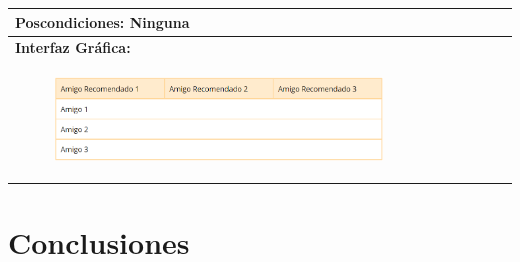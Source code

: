 \documentclass{report}
\begin{document}
\begin{center}
\begin{longtable}{|p{\linewidth}|}
                        \hline
                        \textbf{Poscondiciones:} Ninguna\\
                        \hline
                        \textbf{Interfaz Gráfica:}\\
                        \begin{figure}[H]
                            \centering
                            \includegraphics[width=0.8\textwidth]{./img/grafico/IU Recomendaciones de amigos.PNG}
                        \end{figure}\\
                        \hline
                    \end{longtable}
                \end{center}
                \clearpage
    \chapter{Conclusiones} 
\end{document}
